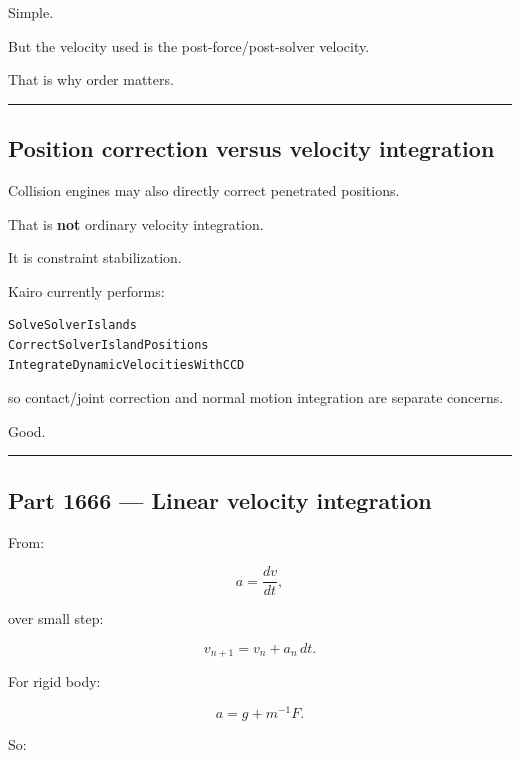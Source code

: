 Simple.

But the velocity used is the post-force/post-solver velocity.

That is why order matters.

\begin{center}\rule{0.5\linewidth}{0.5pt}\end{center}

\subsection{Position correction versus velocity integration}\label{06-engine-ii-ch037-position-correction-versus-velocity-integration}

\hypertarget{06-engine-ii-ch037-position-correction-versus-velocity-integration}{}

Collision engines may also directly correct penetrated positions.

That is \textbf{not} ordinary velocity integration.

It is constraint stabilization.

Kairo currently performs:

\begin{verbatim}
SolveSolverIslands
CorrectSolverIslandPositions
IntegrateDynamicVelocitiesWithCCD
\end{verbatim}

so contact/joint correction and normal motion integration are separate concerns.

Good.

\begin{center}\rule{0.5\linewidth}{0.5pt}\end{center}

\subsection{Part 1666 --- Linear velocity integration}\label{06-engine-ii-ch037-part-1666-linear-velocity-integration}

\hypertarget{06-engine-ii-ch037-part-1666-linear-velocity-integration}{}

From:

\[
a=\frac{dv}{dt},
\]

over small step:

\[
\boxed{
v_{n+1}
=
v_n+a_n\,dt.
}
\]

For rigid body:

\[
a
=
g
+
m^{-1}F.
\]

So:

